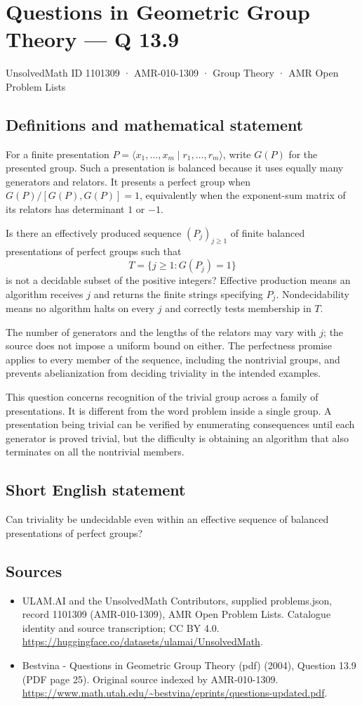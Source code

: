\documentclass[11pt,a4paper]{article}
\begin{document}
\section*{Questions in Geometric Group Theory — Q 13.9}\label{1101309}
{\small UnsolvedMath ID 1101309 · AMR-010-1309 · Group Theory · AMR Open Problem Lists}
\subsection{Definitions and mathematical statement}
For a finite presentation $P=\langle x_1,\ldots,x_m\mid r_1,\ldots,r_m\rangle$, write $G(P)$ for the presented group. Such a presentation is balanced because it uses equally many generators and relators. It presents a perfect group when $G(P)/[G(P),G(P)]=1$, equivalently when the exponent-sum matrix of its relators has determinant $1$ or $-1$.

Is there an effectively produced sequence $(P_j)_{j\geq1}$ of finite balanced presentations of perfect groups such that
\[
 T=\{j\geq1:G(P_j)=1\}
\]
is not a decidable subset of the positive integers? Effective production means an algorithm receives $j$ and returns the finite strings specifying $P_j$. Nondecidability means no algorithm halts on every $j$ and correctly tests membership in $T$.

The number of generators and the lengths of the relators may vary with $j$; the source does not impose a uniform bound on either. The perfectness promise applies to every member of the sequence, including the nontrivial groups, and prevents abelianization from deciding triviality in the intended examples.

This question concerns recognition of the trivial group across a family of presentations. It is different from the word problem inside a single group. A presentation being trivial can be verified by enumerating consequences until each generator is proved trivial, but the difficulty is obtaining an algorithm that also terminates on all the nontrivial members.
\subsection{Short English statement}
Can triviality be undecidable even within an effective sequence of balanced presentations of perfect groups?
\subsection{Sources}
\begin{itemize}
\item[S1] ULAM.AI and the UnsolvedMath Contributors, supplied problems.json, record 1101309 (AMR-010-1309), AMR Open Problem Lists. Catalogue identity and source transcription; CC BY 4.0.
\url{https://huggingface.co/datasets/ulamai/UnsolvedMath}.
\item[S2] Bestvina - Questions in Geometric Group Theory (pdf) (2004), Question 13.9 (PDF page 25). Original source indexed by AMR-010-1309.
\url{https://www.math.utah.edu/~bestvina/eprints/questions-updated.pdf}.
\end{itemize}
\end{document}
